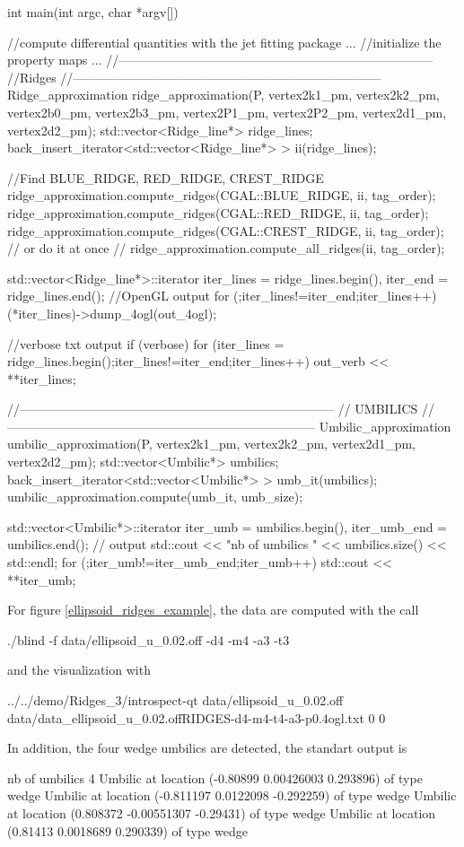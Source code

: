 \begin{ccExampleCode}
int main(int argc, char *argv[])
{  
  //compute differential quantities with the jet fitting package
	...
  //initialize the property maps
	...
   //---------------------------------------------------------------------------
  //Ridges
  //--------------------------------------------------------------------------
  Ridge_approximation ridge_approximation(P, 
					  vertex2k1_pm, vertex2k2_pm,
					  vertex2b0_pm, vertex2b3_pm,
					  vertex2P1_pm, vertex2P2_pm,
					  vertex2d1_pm, vertex2d2_pm);
  std::vector<Ridge_line*> ridge_lines;
  back_insert_iterator<std::vector<Ridge_line*> > ii(ridge_lines);
  
  //Find BLUE_RIDGE, RED_RIDGE, CREST_RIDGE
     ridge_approximation.compute_ridges(CGAL::BLUE_RIDGE, ii, tag_order);  
     ridge_approximation.compute_ridges(CGAL::RED_RIDGE, ii, tag_order);  
     ridge_approximation.compute_ridges(CGAL::CREST_RIDGE, ii, tag_order);  
  // or do it at once
  // ridge_approximation.compute_all_ridges(ii, tag_order);  
 
  std::vector<Ridge_line*>::iterator iter_lines = ridge_lines.begin(), 
    iter_end = ridge_lines.end();
  //OpenGL output
  for (;iter_lines!=iter_end;iter_lines++) (*iter_lines)->dump_4ogl(out_4ogl);
    
  //verbose txt output 
  if (verbose) 
    for (iter_lines = ridge_lines.begin();iter_lines!=iter_end;iter_lines++) 
      out_verb << **iter_lines; 

  //---------------------------------------------------------------------------
  // UMBILICS
  //--------------------------------------------------------------------------
  Umbilic_approximation umbilic_approximation(P, 
					      vertex2k1_pm, vertex2k2_pm,
					      vertex2d1_pm, vertex2d2_pm);
  std::vector<Umbilic*> umbilics;
  back_insert_iterator<std::vector<Umbilic*> > umb_it(umbilics);
  umbilic_approximation.compute(umb_it, umb_size);

  std::vector<Umbilic*>::iterator iter_umb = umbilics.begin(), 
    iter_umb_end = umbilics.end();
  // output
  std::cout << "nb of umbilics " << umbilics.size() << std::endl;
  for (;iter_umb!=iter_umb_end;iter_umb++) std::cout << **iter_umb;
}
\end{ccExampleCode}

For figure \ref{ellipsoid_ridges_example}, the data are computed with
the call
\begin{ccExampleCode}
./blind -f data/ellipsoid_u_0.02.off -d4 -m4 -a3 -t3
\end{ccExampleCode}
and the visualization with 
\begin{ccExampleCode}
 ../../demo/Ridges_3/introspect-qt data/ellipsoid_u_0.02.off data/data_ellipsoid_u_0.02.offRIDGES-d4-m4-t4-a3-p0.4ogl.txt 0 0
\end{ccExampleCode}
In addition, the four wedge umbilics are detected, the standart output is 
\begin{ccExampleCode}
nb of umbilics 4
Umbilic at location (-0.80899 0.00426003 0.293896) of type wedge
Umbilic at location (-0.811197 0.0122098 -0.292259) of type wedge
Umbilic at location (0.808372 -0.00551307 -0.29431) of type wedge
Umbilic at location (0.81413 0.0018689 0.290339) of type wedge
\end{ccExampleCode}


